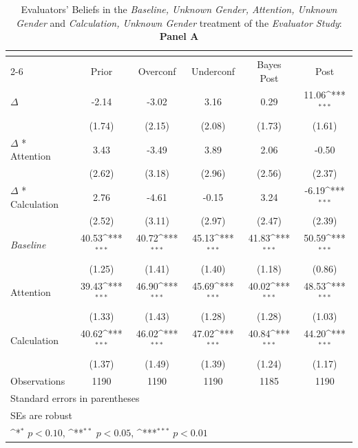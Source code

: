 \begin{table}[htbp]\centering
\def\sym#1{\ifmmode^{#1}\else\(^{#1}\)\fi}
\caption{Evaluators' Beliefs in the \textit{Baseline, Unknown Gender, Attention, Unknown Gender} and \textit{Calculation, Unknown Gender} treatment of the \textit{Evaluator Study}: \textbf{Panel A}}
\begin{tabular}{l*{5}{c}}
\hline\hline
                &\multicolumn{5}{c}{}                                                                          \\\cmidrule(lr){2-6}
                &\multicolumn{1}{c}{Prior}&\multicolumn{1}{c}{Overconf}&\multicolumn{1}{c}{Underconf}&\multicolumn{1}{c}{Bayes Post}&\multicolumn{1}{c}{Post}\\
\hline
$\Delta$        &    -2.14         &    -3.02         &     3.16         &     0.29         &    11.06\sym{***}\\
                &   (1.74)         &   (2.15)         &   (2.08)         &   (1.73)         &   (1.61)         \\
$\Delta$ * Attention&     3.43         &    -3.49         &     3.89         &     2.06         &    -0.50         \\
                &   (2.62)         &   (3.18)         &   (2.96)         &   (2.56)         &   (2.37)         \\
$\Delta$ * Calculation&     2.76         &    -4.61         &    -0.15         &     3.24         &    -6.19\sym{***}\\
                &   (2.52)         &   (3.11)         &   (2.97)         &   (2.47)         &   (2.39)         \\
\textit{Baseline}&    40.53\sym{***}&    40.72\sym{***}&    45.13\sym{***}&    41.83\sym{***}&    50.59\sym{***}\\
                &   (1.25)         &   (1.41)         &   (1.40)         &   (1.18)         &   (0.86)         \\
Attention       &    39.43\sym{***}&    46.90\sym{***}&    45.69\sym{***}&    40.02\sym{***}&    48.53\sym{***}\\
                &   (1.33)         &   (1.43)         &   (1.28)         &   (1.28)         &   (1.03)         \\
Calculation     &    40.62\sym{***}&    46.02\sym{***}&    47.02\sym{***}&    40.84\sym{***}&    44.20\sym{***}\\
                &   (1.37)         &   (1.49)         &   (1.39)         &   (1.24)         &   (1.17)         \\
\hline
Observations    &     1190         &     1190         &     1190         &     1185         &     1190         \\
\hline\hline
\multicolumn{6}{l}{\footnotesize Standard errors in parentheses}\\
\multicolumn{6}{l}{\footnotesize SEs are robust}\\
\multicolumn{6}{l}{\footnotesize \sym{*} \(p<0.10\), \sym{**} \(p<0.05\), \sym{***} \(p<0.01\)}\\
\end{tabular}
\end{table}
